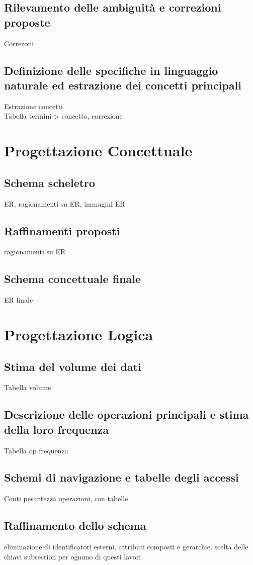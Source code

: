 \documentclass{report}
\begin{document}
\section{Rilevamento delle ambiguità e correzioni proposte}
Correzoni
\section{Definizione delle specifiche in linguaggio naturale ed estrazione dei concetti principali}
Estrazione concetti\\
Tabella termini-> concetto, correzione

\chapter{Progettazione Concettuale}
\section{Schema scheletro}
ER, ragionamenti su ER, immagini ER
\section{Raffinamenti proposti}
ragionamenti su ER
\section{Schema concettuale finale}
ER finale

\chapter{Progettazione Logica}
\section{Stima del volume dei dati}
Tabella volume
\section{Descrizione delle operazioni principali e stima della loro frequenza}
Tabella op frequenza
\section{Schemi di navigazione e tabelle degli accessi}
Conti pesantezza operazioni, con tabelle
\section{Raffinamento dello schema}
eliminazione di identificatori esterni, attributi composti e gerarchie, scelta delle chiavi
subsection per ognuno di questi lavori
\end{document}
